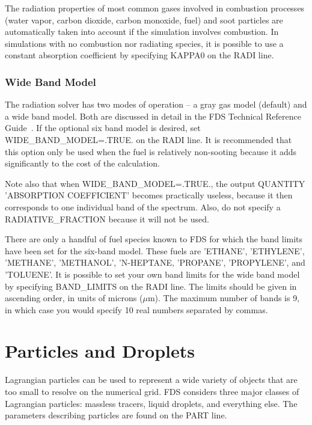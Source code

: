 \documentclass[11pt]{book}
\begin{document}
The radiation properties of most common gases involved in combustion processes (water vapor, carbon dioxide, carbon monoxide, fuel) and soot particles are automatically taken into account if the simulation involves combustion. In simulations with no combustion nor radiating species, it is possible to use a constant absorption coefficient by specifying {\ct KAPPA0} on the {\ct RADI} line.


\subsection{Wide Band Model}

\label{info:RADI_Wide_Band}

The radiation solver has two modes of operation -- a gray gas model (default) and a wide band model. Both are discussed in detail in the FDS Technical Reference Guide~\cite{FDS_Math_Guide}. If the optional six band model is desired, set {\ct WIDE\_BAND\_MODEL=.TRUE.} on the {\ct RADI} line. It is recommended that this option only be used when the fuel is relatively non-sooting because it adds significantly to the cost of the calculation.

Note also that when {\ct WIDE\_BAND\_MODEL=.TRUE.}, the output {\ct QUANTITY} {\ct 'ABSORPTION COEFFICIENT'} becomes practically useless, because it then corresponds to one individual band of the spectrum. Also, do not specify a {\ct RADIATIVE\_FRACTION} because it will not be used.

There are only a handful of fuel species known to FDS for which the band limits have been set for the six-band model. These fuels are {\ct 'ETHANE'}, {\ct 'ETHYLENE'}, {\ct 'METHANE'}, {\ct 'METHANOL'}, {\ct 'N-HEPTANE}, {\ct 'PROPANE'}, {\ct 'PROPYLENE'}, and {\ct 'TOLUENE'}.  It is possible to set your own band limits for the wide band model by specifying {\ct BAND\_LIMITS} on the {\ct RADI} line. The limits should be given in ascending order, in units of microns ($\mu$m). The maximum number of bands is 9, in which case you would specify 10 real numbers separated by commas.




\chapter{Particles and Droplets}
\label{info:PART}


Lagrangian particles can be used to represent a wide variety of objects that are too small to resolve on the numerical grid. FDS considers three major classes of Lagrangian particles: massless tracers, liquid droplets, and everything else. The parameters describing particles are found on the {\ct PART} line.
\end{document}
